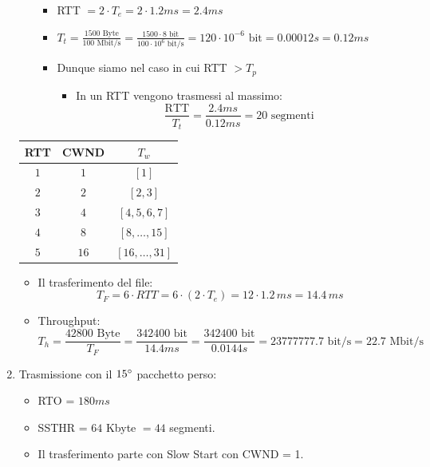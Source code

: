 \documentclass[10pt,a4paper]{article}
\newcommand{\lightrule}{%
	\arrayrulecolor{black!30}%
	\midrule[\lightrulewidth]%
	\arrayrulecolor{black}}
\begin{document}
\begin{enumerate}
\begin{itemize}
				\begin{itemize}
					\item RTT $= 2 \cdot T_e = 2 \cdot 1.2 ms = 2.4ms$
					\item $T_t = \displaystyle{ \frac{1500 \textrm{ Byte}}{100 \textrm{ Mbit/s}}} =\displaystyle{ \frac{1500 \cdot 8 \textrm{ bit}}{100 \cdot 10^6 \textrm{ bit/s}}} = 120 \cdot 10^{-6} \textrm{ bit} = 0.00012 s = 0.12 ms$ 
					\item Dunque siamo nel caso in cui RTT $> T_p$
						\begin{itemize}
							\item In un RTT vengono trasmessi al massimo: $$\frac{\textrm{RTT}}{T_t} = \frac{2.4 ms}{0.12 ms} = 20 \textrm{ segmenti}$$
						\end{itemize}
				\end{itemize}
			\end{itemize}
			\begin{center}
				\centering
 				\begin{tabular}{@{} *{3}{c} @{}}
					\toprule
						\textbf{RTT} & \textbf{CWND} & \textbf{$T_w$} \\
					\midrule
						$1$ & $1$ & $[1]$ \\ 
					\lightrule
						$2$ & $2$ & $[2,3]$ \\
					\lightrule
						$3$ & $4$ & $[4,5,6,7]$ \\ 				
					\lightrule
						$4$ & $8$ & $[8,\dots,15]$ \\
					\lightrule
						$5$ & $16$ & $[16,\dots,31]$ \\
					\bottomrule
				\end{tabular}
			\end{center}
			\begin{itemize}
				\item Il trasferimento del file: $$T_{F} = 6 \cdot RTT = 6 \cdot (2 \cdot T_e) = 12 \cdot 1.2 \,ms = 14.4 \,ms$$
				\item Throughput: $$T_h = \displaystyle{\frac{42800 \textrm{ Byte}}{T_F} = \frac{342400 \textrm{ bit}}{14.4 ms} = \frac{342400 \textrm{ bit}}{0.0144 s} = 23777777.7 \textrm{ bit/s} = 22.7 \textrm{ Mbit/s}}$$
			\end{itemize}
		\item Trasmissione con il $15 \degree$ pacchetto perso:
			\begin{itemize}
				\item RTO = $180 ms$
				\item SSTHR = $64$ Kbyte $= 44$ segmenti.
				\item Il trasferimento parte con Slow Start con CWND = 1.

\end{itemize}
\end{enumerate}
\end{document}

